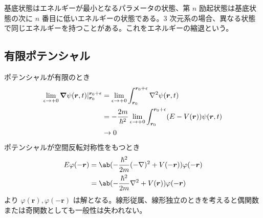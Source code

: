 \documentclass[uplatex,dvipdfmx,a4paper,11pt]{jlreq}
\newcommand{\rr}{\bm{r}}
\numberwithin{equation}{section}
\theoremstyle{definition}
\begin{document}
\begin{definition}[エネルギーの縮退]
  基底状態はエネルギーが最小となるパラメータの状態、第 $n$ 励起状態は基底状態の次に $n$ 番目に低いエネルギーの状態である。3 次元系の場合、異なる状態で同じエネルギーを持つことがある。これをエネルギーの縮退という。
\end{definition}

\subsection{有限ポテンシャル}
ポテンシャルが有限のとき
\begin{align}
  \lim_{\epsilon\to +0}\vnabla\psi(\rr, t)|_{\rr_0}^{\rr_0 + \epsilon} & = \lim_{\epsilon\to +0}\int_{\rr_0}^{\rr_0 + \epsilon}\nabla^2\psi(\rr, t)                        \\
                                                                       & = -\frac{2m}{\hbar^2}\lim_{\epsilon\to +0}\int_{\rr_0}^{\rr_0 + \epsilon}(E - V(\rr))\psi(\rr, t) \\
                                                                       & \to 0
\end{align}
ポテンシャルが空間反転対称性をもつとき
\begin{align}
  E\varphi(-\rr) & = \ab(-\frac{\hbar^2}{2m}(-\nabla)^2 + V(-\rr))\varphi(-\rr) \\
                 & = \ab(-\frac{\hbar^2}{2m}\nabla^2 + V(\rr))\varphi(-\rr)
\end{align}
より $\varphi(\rr), \varphi(-\rr)$ は解となる。線形従属、線形独立のときを考えると偶関数または奇関数としても一般性は失われない。
\end{document}
